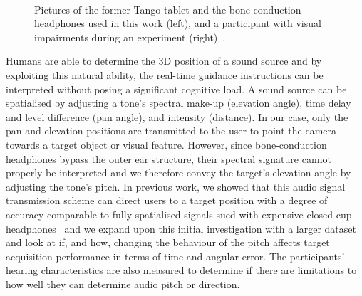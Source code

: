 \documentclass[]{interact}
\begin{document}
\begin{figure}[t]
  \centering
~
  \caption{Pictures of the former Tango tablet and the bone-conduction headphones used in this work (left), and a participant with visual impairments during an experiment (right)~\citep{lock2019bone}.}
\end{figure}

Humans are able to determine the 3D position of a sound source and by exploiting this natural ability, the real-time guidance instructions can be interpreted without posing a significant cognitive load.
A sound source can be spatialised by adjusting a tone's spectral make-up (elevation angle), time delay and level difference (pan angle), and intensity (distance).
In our case, only the pan and elevation positions are transmitted to the user to point the camera towards a target object or visual feature.
However, since bone-conduction headphones bypass the outer ear structure, their spectral signature cannot properly be interpreted and we therefore convey the target's elevation angle by adjusting the tone's pitch.
In previous work, we showed that this audio signal transmission scheme can direct users to a target position with a degree of accuracy comparable to fully spatialised signals sued with expensive closed-cup headphones~\citep{lock2019bone,macdonald2006spatial} and we expand upon this initial investigation with a larger dataset and look at if, and how, changing the behaviour of the pitch affects target acquisition performance in terms of time and angular error. 
The participants' hearing characteristics are also measured to determine if there are limitations to how well they can determine audio pitch or direction. 
\end{document}
